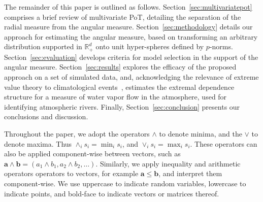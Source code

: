 The remainder of this paper is outlined as follows. 
    Section~\ref{sec:multivariatepot} comprises a brief review of multivariate PoT, 
      detailing the separation of the radial measure from the angular measure.
    Section~\ref{sec:methodology} details our approach for estimating the angular 
      measure, based on transforming an arbitrary 
      distribution supported in ${\mathbb R}_+^d$ 
      onto unit hyper-spheres defined by $p$-norms. 
    Section~\ref{sec:evaluation} develops criteria for model selection in the support 
      of the angular measure.  
    Section~\ref{sec:results} explores the efficacy of the proposed approach on a set 
      of simulated data, and, acknowledging the relevance of extreme value theory to 
      climatological events~\citep{jentsch2007,vousdoukas2018,li2019}, estimates the 
      extremal dependence structure for a measure of water vapor flow in the atmosphere, 
      used for identifying atmospheric rivers.  
    Finally, Section~\ref{sec:conclusion} presents our conclusions and discussion.

Throughout the paper, we adopt the operators $\wedge$ to denote minima, and 
    the $\vee$ to denote maxima.  Thus $\wedge_i s_i = \min_i s_i$, and 
    $\vee_i s_i = \max_i s_i$.  These operators can also be applied component-wise 
    between vectors, such as $\bm{a}\wedge\bm{b} = (a_1\wedge b_1, a_2\wedge b_2,\ldots)$.  
    Similarly, we apply inequality and arithmetic operators operators to vectors, for
    example $\bm{a}\leq \bm{b}$, and interpret them component-wise.
    We use uppercase to indicate random variables, lowercase to indicate points, and
    bold-face to indicate vectors or matrices thereof.
  
